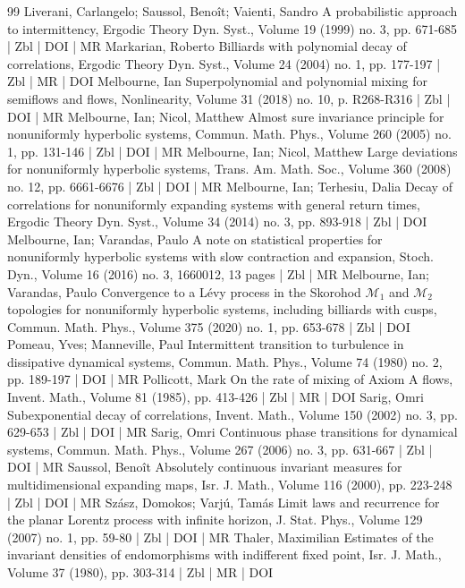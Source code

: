 \documentclass[10pt]{amsart}
\theoremstyle{definition}\newtheorem{defi}[theo]{Definition}\newtheorem{rema}[theo]{Remark}\newtheorem{exam}[theo]{Example}\newtheorem{exem}[theo]{Example}\newtheorem{nota}[theo]{Notation}
\begin{document}
\begin{thebibliography}{99}
Liverani, Carlangelo; Saussol, Benoît; Vaienti, Sandro A probabilistic approach to intermittency, Ergodic Theory Dyn. Syst., Volume 19 (1999) no. 3, pp. 671-685 | Zbl | DOI | MR
Markarian, Roberto Billiards with polynomial decay of correlations, Ergodic Theory Dyn. Syst., Volume 24 (2004) no. 1, pp. 177-197 | Zbl | MR | DOI
Melbourne, Ian Superpolynomial and polynomial mixing for semiflows and flows, Nonlinearity, Volume 31 (2018) no. 10, p. R268-R316 | Zbl | DOI | MR
Melbourne, Ian; Nicol, Matthew Almost sure invariance principle for nonuniformly hyperbolic systems, Commun. Math. Phys., Volume 260 (2005) no. 1, pp. 131-146 | Zbl | DOI | MR
Melbourne, Ian; Nicol, Matthew Large deviations for nonuniformly hyperbolic systems, Trans. Am. Math. Soc., Volume 360 (2008) no. 12, pp. 6661-6676 | Zbl | DOI | MR
Melbourne, Ian; Terhesiu, Dalia Decay of correlations for nonuniformly expanding systems with general return times, Ergodic Theory Dyn. Syst., Volume 34 (2014) no. 3, pp. 893-918 | Zbl | DOI
Melbourne, Ian; Varandas, Paulo A note on statistical properties for nonuniformly hyperbolic systems with slow contraction and expansion, Stoch. Dyn., Volume 16 (2016) no. 3, 1660012, 13 pages | Zbl | MR
Melbourne, Ian; Varandas, Paulo Convergence to a Lévy process in the Skorohod $\mathcal{M}_1$ and $\mathcal{M}_2$ topologies for nonuniformly hyperbolic systems, including billiards with cusps, Commun. Math. Phys., Volume 375 (2020) no. 1, pp. 653-678 | Zbl | DOI
Pomeau, Yves; Manneville, Paul Intermittent transition to turbulence in dissipative dynamical systems, Commun. Math. Phys., Volume 74 (1980) no. 2, pp. 189-197 | DOI | MR
Pollicott, Mark On the rate of mixing of Axiom A flows, Invent. Math., Volume 81 (1985), pp. 413-426 | Zbl | MR | DOI
Sarig, Omri Subexponential decay of correlations, Invent. Math., Volume 150 (2002) no. 3, pp. 629-653 | Zbl | DOI | MR
Sarig, Omri Continuous phase transitions for dynamical systems, Commun. Math. Phys., Volume 267 (2006) no. 3, pp. 631-667 | Zbl | DOI | MR
Saussol, Benoît Absolutely continuous invariant measures for multidimensional expanding maps, Isr. J. Math., Volume 116 (2000), pp. 223-248 | Zbl | DOI | MR
Szász, Domokos; Varjú, Tamás Limit laws and recurrence for the planar Lorentz process with infinite horizon, J. Stat. Phys., Volume 129 (2007) no. 1, pp. 59-80 | Zbl | DOI | MR
Thaler, Maximilian Estimates of the invariant densities of endomorphisms with indifferent fixed point, Isr. J. Math., Volume 37 (1980), pp. 303-314 | Zbl | MR | DOI

\end{thebibliography}
\end{document}
